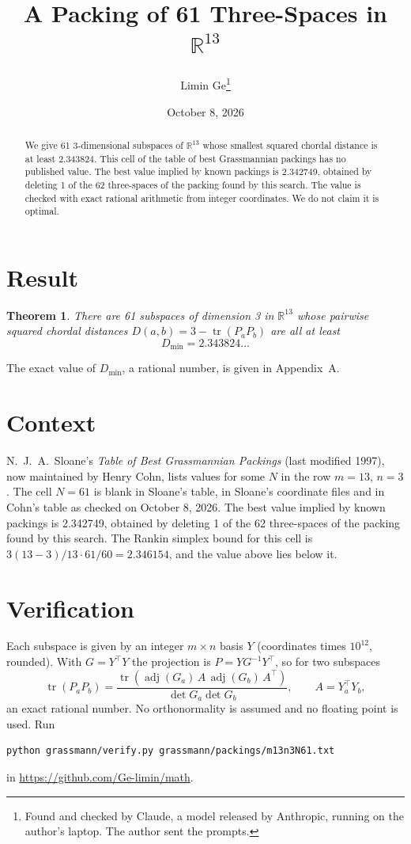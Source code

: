 \documentclass[11pt,a4paper]{article}
\title{A Packing of 61 Three-Spaces in $\mathbb{R}^{13}$}
\author{Limin Ge\thanks{Found and checked by Claude, a model released by Anthropic, running on the author's laptop. The author sent the prompts.}}
\date{October 8, 2026}
\newtheorem*{theorem}{Theorem}
\begin{document}
\maketitle
\begin{abstract}
We give 61 3-dimensional subspaces of $\mathbb{R}^{13}$ whose smallest squared chordal distance is at least 2.343824. This cell of the table of best Grassmannian packings has no published value. The best value implied by known packings is 2.342749, obtained by deleting 1 of the 62 three-spaces of the packing found by this search. The value is checked with exact rational arithmetic from integer coordinates. We do not claim it is optimal.
\end{abstract}

\section{Result}
\begin{theorem}
There are 61 subspaces of dimension 3 in $\mathbb{R}^{13}$ whose pairwise squared chordal distances $D(a,b) = 3 - \operatorname{tr}(P_aP_b)$ are all at least
\[ D_{\min} = 2.343824\ldots \]
\end{theorem}
The exact value of $D_{\min}$, a rational number, is given in Appendix~A.


\section{Context}
N.~J.~A.~Sloane's \emph{Table of Best Grassmannian Packings} (last modified 1997), now maintained by Henry Cohn, lists values for some $N$ in the row $m=13$, $n=3$. The cell $N=61$ is blank in Sloane's table, in Sloane's coordinate files and in Cohn's table as checked on October 8, 2026. The best value implied by known packings is 2.342749, obtained by deleting 1 of the 62 three-spaces of the packing found by this search. The Rankin simplex bound for this cell is $3(13-3)/13\cdot 61/60 = 2.346154$, and the value above lies below it.


\section{Verification}
Each subspace is given by an integer $m\times n$ basis $Y$ (coordinates times $10^{12}$, rounded). With $G=Y^\top Y$ the projection is $P=YG^{-1}Y^\top$, so for two subspaces
\[ \operatorname{tr}(P_aP_b)=\frac{\operatorname{tr}(\operatorname{adj}(G_a)\,A\,\operatorname{adj}(G_b)\,A^\top)}{\det G_a\det G_b},\qquad A=Y_a^\top Y_b, \]
an exact rational number. No orthonormality is assumed and no floating point is used. Run
\begin{verbatim}
python grassmann/verify.py grassmann/packings/m13n3N61.txt
\end{verbatim}
in \url{https://github.com/Ge-limin/math}.
\end{document}
